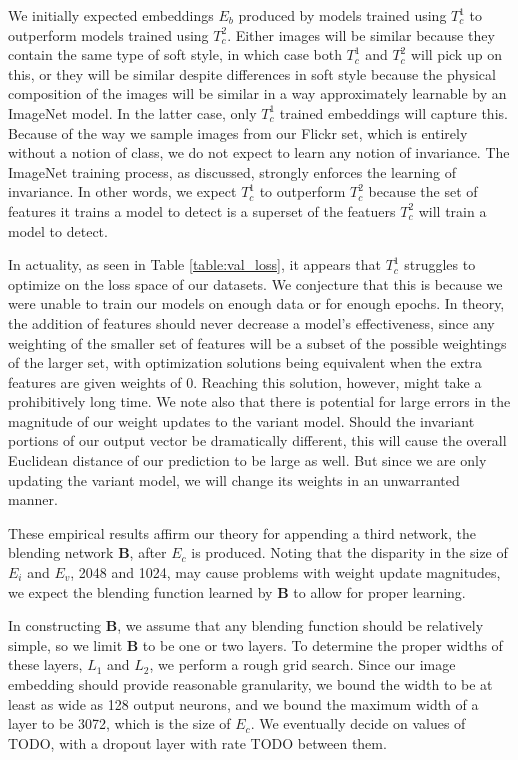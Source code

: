 We initially expected embeddings $E_b$ produced by models trained using $T_c^1$ to outperform models trained using $T_c^2$. Either images will be similar because they contain the same type of soft style, in which case both $T_c^1$ and $T_c^2$ will pick up on this, or they will be similar despite differences in soft style because the physical composition of the images will be similar in a way approximately learnable by an ImageNet model. In the latter case, only $T_c^1$ trained embeddings will capture this. Because of the way we sample images from our Flickr set, which is entirely without a notion of class, we do not expect to learn any notion of invariance. The ImageNet training process, as discussed, strongly enforces the learning of invariance. In other words, we expect $T_c^1$ to outperform $T_c^2$ because the set of features it trains a model to detect is a superset of the featuers $T_c^2$ will train a model to detect. 

In actuality, as seen in Table \ref{table:val_loss}, it appears that $T_c^1$ struggles to optimize on the loss space of our datasets. We conjecture that this is because we were unable to train our models on enough data or for enough epochs. In theory, the addition of features should never decrease a model's effectiveness, since any weighting of the smaller set of features will be a subset of the possible weightings of the larger set, with optimization solutions being equivalent when the extra features are given weights of 0. Reaching this solution, however, might take a prohibitively long time. We note also that there is potential for large errors in the magnitude of our weight updates to the variant model. Should the invariant portions of our output vector be dramatically different, this will cause the overall Euclidean distance of our prediction to be large as well. But since we are only updating the variant model, we will change its weights in an unwarranted manner. 

These empirical results affirm our theory for appending a third network, the blending network \textbf{B}, after $E_c$ is produced. Noting that the disparity in the size of $E_i$ and $E_v$, 2048 and 1024, may cause problems with weight update magnitudes, we expect the blending function learned by \textbf{B} to allow for proper learning.

In constructing \textbf{B}, we assume that any blending function should be relatively simple, so we limit \textbf{B} to be one or two layers. To determine the proper widths of these layers, $L_1$ and $L_2$, we perform a rough grid search. Since our image embedding should provide reasonable granularity, we bound the width to be at least as wide as 128 output neurons, and we bound the maximum width of a layer to be 3072, which is the size of $E_c$. We eventually decide on values of TODO, with a dropout layer with rate TODO between them. 

